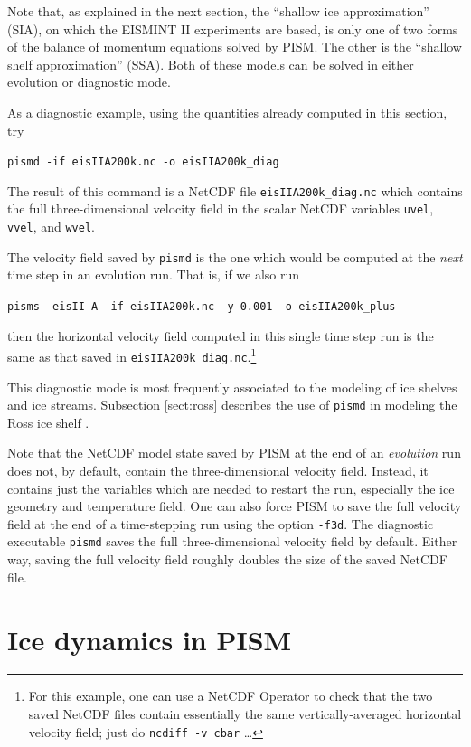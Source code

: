\documentclass[11pt,final]{amsart}
\renewcommand{\t}[1]{\texttt{#1}}
\begin{document}
Note that, as explained in the next section, the ``shallow ice approximation'' (SIA), on which the EISMINT II experiments are based, is only one of two forms of the balance of momentum equations solved by PISM.  The other is the ``shallow shelf approximation'' (SSA).  Both of these models can be solved in either evolution or diagnostic mode.

As a diagnostic example, using the quantities already computed in this section, try

\verb|pismd -if eisIIA200k.nc -o eisIIA200k_diag|

\noindent The result of this command is a NetCDF file \verb|eisIIA200k_diag.nc| which contains the full three-dimensional velocity field in the scalar NetCDF variables \verb|uvel|, \verb|vvel|, and \verb|wvel|.

The velocity field saved by \verb|pismd| is the one which would be computed at the \emph{next} time step in an evolution run.  That is, if we also run

\verb|pisms -eisII A -if eisIIA200k.nc -y 0.001 -o eisIIA200k_plus|

\noindent then the horizontal velocity field computed in this single time step run is the same as that saved in \verb|eisIIA200k_diag.nc|.\footnote{For this example, one can use a NetCDF Operator to check that the two saved NetCDF files contain essentially the same vertically-averaged horizontal velocity field; just do \t{ncdiff -v cbar} \dots}

This diagnostic mode is most frequently associated to the modeling of ice shelves and ice streams.  Subsection \ref{sect:ross} describes the use of \verb|pismd| in modeling the Ross ice shelf \cite{MacAyealetal}.

Note that the NetCDF model state saved by PISM at the end of an \emph{evolution} run does not, by default, contain the three-dimensional velocity field.  Instead, it contains just the variables which are needed to restart the run, especially the ice geometry and temperature field.  One can also force PISM to save the full velocity field at the end of a time-stepping run using the option \verb|-f3d|.  The diagnostic executable \verb|pismd| saves the full three-dimensional velocity field by default.  Either way, saving the full velocity field roughly doubles the size of the saved NetCDF file.


\clearpage
\newpage
\section{Ice dynamics in PISM}\label{sect:dynamics}
\end{document}

